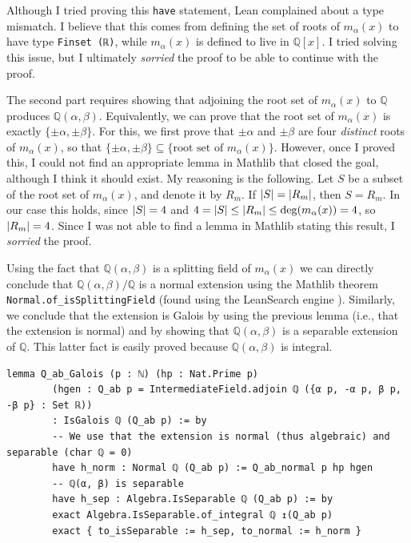 \documentclass[a4paper,11pt]{article}
\theoremstyle{plain}
\newcommand{\Q}{\ensuremath{\mathbb{Q}}} %
\begin{document}
	Although I tried proving this \lstinline|have| statement, Lean complained about a type mismatch. I believe that this comes from defining the set of roots of $m_\alpha(x)$ to have type \lstinline|Finset (ℝ)|, while $m_\alpha(x)$ is defined to live in $\Q[x]$. I tried solving this issue, but I ultimately \emph{sorried} the proof to be able to continue with the proof.
	
	The second part requires showing that adjoining the root set of $m_\alpha(x)$ to $\Q$ produces $\Q(\alpha,\beta)$. Equivalently, we can prove that the root set of $m_\alpha(x)$ is exactly $\{\pm\alpha,\pm\beta\}$. For this, we first prove that $\pm\alpha$ and $\pm\beta$ are four \emph{distinct} roots of $m_\alpha(x)$, so that $\{\pm\alpha,\pm\beta\}\subseteq \{\text{root set of $m_\alpha(x)$}\}$. However, once I proved this, I could not find an appropriate lemma in Mathlib \cite{Mathlib} that closed the goal, although I think it should exist. My reasoning is the following. Let $S$ be a subset of the root set of $m_\alpha(x)$, and denote it by $R_m$. If $\abs{S}=\abs{R_m}$, then $S=R_m$. In our case this holds, since $\abs{S}=4$ and $4=\abs{S}\leq\abs{R_m}\leq\deg(m_\alpha(x))=4$, so $\abs{R_m}=4$. Since I was not able to find a lemma in Mathlib stating this result, I \emph{sorried} the proof.
	
	Using the fact that $\Q(\alpha,\beta)$ is a splitting field of $m_\alpha(x)$ we can directly conclude that $\Q(\alpha,\beta)/\Q$ is a normal extension using the Mathlib theorem \lstinline|Normal.of_isSplittingField| (found using the LeanSearch engine \cite{LeanSearch}). Similarly, we conclude that the extension is Galois by using the previous lemma (i.e., that the extension is normal) and by showing that $\Q(\alpha,\beta)$ is a separable extension of $\Q$. This latter fact is easily proved because $\Q(\alpha,\beta)$ is integral.\\
	
	\begin{lstlisting}[caption={Proving that $\Q(\alpha,\beta)$ is a Galois extension of $\Q$.}, label={list:5}]
		lemma Q_ab_Galois (p : ℕ) (hp : Nat.Prime p)
		(hgen : Q_ab p = IntermediateField.adjoin ℚ ({α p, -α p, β p, -β p} : Set ℝ))
		: IsGalois ℚ (Q_ab p) := by
		-- We use that the extension is normal (thus algebraic) and separable (char ℚ = 0)
		have h_norm : Normal ℚ (Q_ab p) := Q_ab_normal p hp hgen
		-- ℚ(α, β) is separable
		have h_sep : Algebra.IsSeparable ℚ (Q_ab p) := by
		exact Algebra.IsSeparable.of_integral ℚ ↥(Q_ab p)
		exact { to_isSeparable := h_sep, to_normal := h_norm }
	\end{lstlisting}
\end{document}
